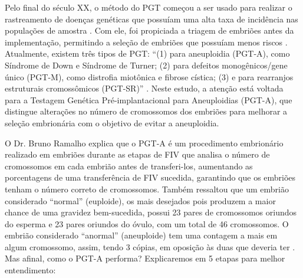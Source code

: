 Pelo final do século XX, o método do PGT começou a ser usado para realizar o rastreamento de doenças genéticas que possuíam uma alta taxa de incidência nas populações de amostra \cite{yang2024}. Com ele, foi propiciada a triagem de embriões antes da implementação, permitindo a seleção de embriões que possuíam menos riscos \cite{scienceofbiogenetics2024}. Atualmente, existem três tipos de PGT: “(1) para aneuploidia (PGT-A), como Síndrome de Down e Síndrome de Turner; (2) para defeitos monogênicos/gene único (PGT-M), como distrofia miotônica e fibrose cística; (3) e para rearranjos estruturais cromossômicos (PGT-SR)” \cite{yang2024}. Neste estudo, a atenção está voltada para a Testagem Genética Pré-implantacional para Aneuploidias (PGT-A), que distingue alterações no número de cromossomos dos embriões para melhorar a seleção embrionária com o objetivo de evitar a aneuploidia.  

O Dr. Bruno Ramalho explica que o PGT-A é um procedimento embrionário realizado em embriões durante as etapas de FIV que analisa o número de cromossomos em cada embrião antes de transferi-los, aumentando as porcentagens de uma transferência de FIV sucedida, garantindo que os embriões tenham o número correto de cromossomos. Também ressaltou que um embrião considerado “normal” (euploide), os mais desejados pois produzem a maior chance de uma gravidez bem-sucedida, possui 23 pares de cromossomos oriundos do esperma e 23 pares oriundos do óvulo, com um total de 46 cromossomos. O embrião considerado “anormal” (aneuploide) tem uma contagem a mais em algum cromossomo, assim, tendo 3 cópias, em oposição às duas que deveria ter \cite{cnyfertility2024}. Mas afinal, como o PGT-A performa? Explicaremos em 5 etapas para melhor entendimento:

